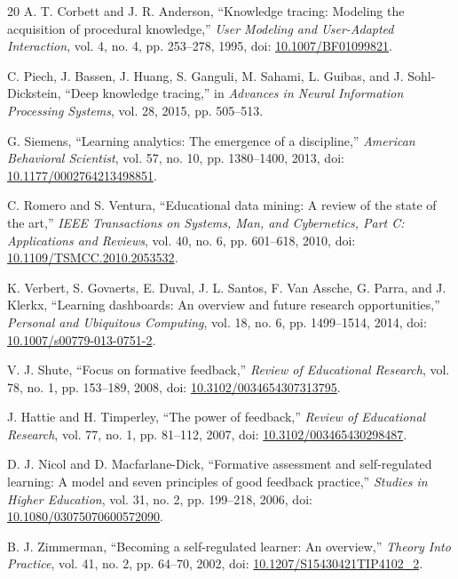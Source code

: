 \documentclass[conference]{IEEEtran}
\begin{document}
\begin{thebibliography}{20}
A. T. Corbett and J. R. Anderson, ``Knowledge tracing: Modeling the acquisition of procedural knowledge,'' \textit{User Modeling and User-Adapted Interaction}, vol. 4, no. 4, pp. 253--278, 1995, doi: \href{https://doi.org/10.1007/BF01099821}{10.1007/BF01099821}.

C. Piech, J. Bassen, J. Huang, S. Ganguli, M. Sahami, L. Guibas, and J. Sohl-Dickstein, ``Deep knowledge tracing,'' in \textit{Advances in Neural Information Processing Systems}, vol. 28, 2015, pp. 505--513.

G. Siemens, ``Learning analytics: The emergence of a discipline,'' \textit{American Behavioral Scientist}, vol. 57, no. 10, pp. 1380--1400, 2013, doi: \href{https://doi.org/10.1177/0002764213498851}{10.1177/0002764213498851}.

C. Romero and S. Ventura, ``Educational data mining: A review of the state of the art,'' \textit{IEEE Transactions on Systems, Man, and Cybernetics, Part C: Applications and Reviews}, vol. 40, no. 6, pp. 601--618, 2010, doi: \href{https://doi.org/10.1109/TSMCC.2010.2053532}{10.1109/TSMCC.2010.2053532}.

K. Verbert, S. Govaerts, E. Duval, J. L. Santos, F. Van Assche, G. Parra, and J. Klerkx, ``Learning dashboards: An overview and future research opportunities,'' \textit{Personal and Ubiquitous Computing}, vol. 18, no. 6, pp. 1499--1514, 2014, doi: \href{https://doi.org/10.1007/s00779-013-0751-2}{10.1007/s00779-013-0751-2}.

V. J. Shute, ``Focus on formative feedback,'' \textit{Review of Educational Research}, vol. 78, no. 1, pp. 153--189, 2008, doi: \href{https://doi.org/10.3102/0034654307313795}{10.3102/0034654307313795}.

J. Hattie and H. Timperley, ``The power of feedback,'' \textit{Review of Educational Research}, vol. 77, no. 1, pp. 81--112, 2007, doi: \href{https://doi.org/10.3102/003465430298487}{10.3102/003465430298487}.

D. J. Nicol and D. Macfarlane-Dick, ``Formative assessment and self-regulated learning: A model and seven principles of good feedback practice,'' \textit{Studies in Higher Education}, vol. 31, no. 2, pp. 199--218, 2006, doi: \href{https://doi.org/10.1080/03075070600572090}{10.1080/03075070600572090}.

B. J. Zimmerman, ``Becoming a self-regulated learner: An overview,'' \textit{Theory Into Practice}, vol. 41, no. 2, pp. 64--70, 2002, doi: \href{https://doi.org/10.1207/S15430421TIP4102_2}{10.1207/S15430421TIP4102\_2}.


\end{thebibliography}
\end{document}
